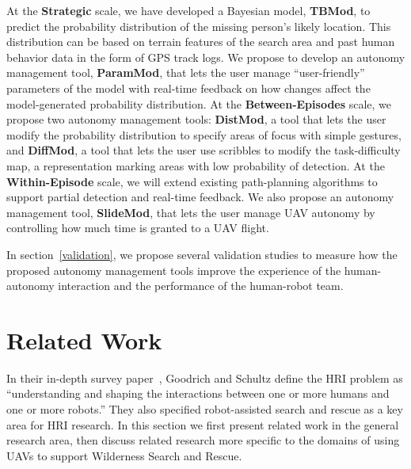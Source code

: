 At the \textbf{Strategic} scale, we have developed a Bayesian model, \textbf{TBMod}, to predict the probability distribution of the missing person's likely location. This distribution can be based on terrain features of the search area and past human behavior data in the form of GPS track logs. We propose to develop an autonomy management tool, \textbf{ParamMod}, that lets the user manage ``user-friendly'' parameters of the model with real-time feedback on how changes affect the model-generated probability distribution. At the \textbf{Between-Episodes} scale, we propose two autonomy management tools: \textbf{DistMod}, a tool that lets the user modify the probability distribution to specify areas of focus with simple gestures, and \textbf{DiffMod}, a tool that lets the user use scribbles to modify the task-difficulty map, a representation marking areas with low probability of detection. At the \textbf{Within-Episode} scale, we will extend existing path-planning algorithms to support partial detection and real-time feedback. We also propose an autonomy management tool, \textbf{SlideMod}, that lets the user manage UAV autonomy by controlling how much time is granted to a UAV flight. 

In  section~\ref{validation}, we propose several validation studies to measure how the proposed autonomy management tools improve the experience of the human-autonomy interaction and the performance of the human-robot team.

\section{Related Work}
\label{related}

In their in-depth survey paper~\cite{Goodrich2007HRISurvey}, Goodrich and Schultz define the HRI problem as ``understanding and shaping the interactions between one or more humans and one or more robots.'' They also specified robot-assisted search and rescue as a key area for HRI research. In this section we first present related work in the general research area, then discuss related research more specific to the domains of using UAVs to support Wilderness Search and Rescue.

